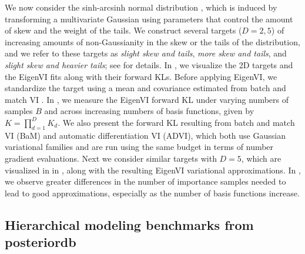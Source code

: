 We now consider the  sinh-arcsinh normal distribution \citep{jones2009sinh,jones2019sinh},
which is induced by transforming a multivariate Gaussian using parameters that
control the amount of skew and the weight of the tails.
%
We construct several targets ($D=2,5$) of
increasing amounts of non-Gaussianity in the skew or the tails of the distribution,
and we refer to these targets as
\emph{slight skew and tails}, \emph{more skew and tails}, and \emph{slight skew and heavier
tails}; see   for details.
%
In ,
we visualize the 2D targets and the EigenVI fits along with their forward KLs.
Before applying EigenVI, we standardize the target using a
mean and covariance estimated from batch and match VI \citep{cai2024}.
%
In , we measure the EigenVI forward KL under varying numbers of samples $B$
and across increasing numbers of basis functions, given by $K\!=\!\prod_{d=1}^D K_d$.
We also present the forward KL resulting from  batch and match VI (BaM) and automatic differentiation VI (ADVI),
which both use Gaussian variational families and are run using the same budget in terms of number gradient
evaluations.
%
Next we consider similar targets with $D=5$, which are visualized in
in , along with the resulting EigenVI variational approximations.
%
In ,
we observe greater differences in the number of importance samples
needed to lead to good approximations, especially as the number of basis functions increase.


\subsection{Hierarchical modeling benchmarks from posteriordb}


